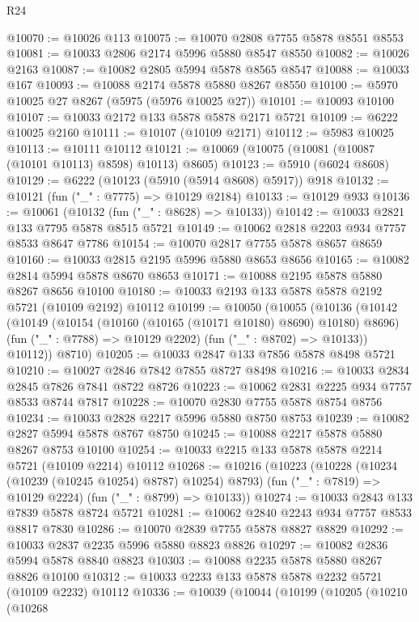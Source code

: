 \begin{lexlean}{R24}
\begin{coremodule}
@10070 := @10026 @113
@10075 := @10070 @2808 @7755 @5878 @8551 @8553
@10081 := @10033 @2806 @2174 @5996 @5880 @8547 @8550
@10082 := @10026 @2163
@10087 := @10082 @2805 @5994 @5878 @8565 @8547
@10088 := @10033 @167
@10093 := @10088 @2174 @5878 @5880 @8267 @8550
@10100 := @5970 @10025 @27 @8267 (@5975 (@5976 @10025 @27))
@10101 := @10093 @10100
@10107 := @10033 @2172 @133 @5878 @5878 @2171 @5721
@10109 := @6222 @10025 @2160
@10111 := @10107 (@10109 @2171)
@10112 := @5983 @10025
@10113 := @10111 @10112
@10121 := @10069 (@10075 (@10081 (@10087 (@10101 @10113) @8598) @10113) @8605)
@10123 := @5910 (@6024 @8608)
@10129 := @6222 (@10123 (@5910 (@5914 @8608) @5917)) @918
@10132 := @10121 (fun ("_" : @7775) => @10129 @2184)
@10133 := @10129 @933
@10136 := @10061 (@10132 (fun ("_" : @8628) => @10133))
@10142 := @10033 @2821 @133 @7795 @5878 @8515 @5721
@10149 := @10062 @2818 @2203 @934 @7757 @8533 @8647 @7786
@10154 := @10070 @2817 @7755 @5878 @8657 @8659
@10160 := @10033 @2815 @2195 @5996 @5880 @8653 @8656
@10165 := @10082 @2814 @5994 @5878 @8670 @8653
@10171 := @10088 @2195 @5878 @5880 @8267 @8656 @10100
@10180 := @10033 @2193 @133 @5878 @5878 @2192 @5721 (@10109 @2192) @10112
@10199 := @10050
    (@10055
      (@10136
        (@10142
          (@10149
            (@10154 (@10160 (@10165 (@10171 @10180) @8690) @10180) @8696)
            (fun ("_" : @7788) => @10129 @2202)
            (fun ("_" : @8702) => @10133))
          @10112))
      @8710)
@10205 := @10033 @2847 @133 @7856 @5878 @8498 @5721
@10210 := @10027 @2846 @7842 @7855 @8727 @8498
@10216 := @10033 @2834 @2845 @7826 @7841 @8722 @8726
@10223 := @10062 @2831 @2225 @934 @7757 @8533 @8744 @7817
@10228 := @10070 @2830 @7755 @5878 @8754 @8756
@10234 := @10033 @2828 @2217 @5996 @5880 @8750 @8753
@10239 := @10082 @2827 @5994 @5878 @8767 @8750
@10245 := @10088 @2217 @5878 @5880 @8267 @8753 @10100
@10254 := @10033 @2215 @133 @5878 @5878 @2214 @5721 (@10109 @2214) @10112
@10268 := @10216
    (@10223
      (@10228 (@10234 (@10239 (@10245 @10254) @8787) @10254) @8793)
      (fun ("_" : @7819) => @10129 @2224)
      (fun ("_" : @8799) => @10133))
@10274 := @10033 @2843 @133 @7839 @5878 @8724 @5721
@10281 := @10062 @2840 @2243 @934 @7757 @8533 @8817 @7830
@10286 := @10070 @2839 @7755 @5878 @8827 @8829
@10292 := @10033 @2837 @2235 @5996 @5880 @8823 @8826
@10297 := @10082 @2836 @5994 @5878 @8840 @8823
@10303 := @10088 @2235 @5878 @5880 @8267 @8826 @10100
@10312 := @10033 @2233 @133 @5878 @5878 @2232 @5721 (@10109 @2232) @10112
@10336 := @10039
    (@10044
      (@10199
        (@10205
          (@10210
            (@10268

\end{coremodule}
\end{lexlean}
